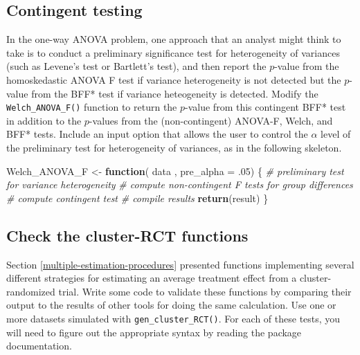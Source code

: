 \documentclass[
]{book}
\newenvironment{Shaded}{\begin{snugshade}}{\end{snugshade}}
\newcommand{\AttributeTok}[1]{\textcolor[rgb]{0.13,0.29,0.53}{#1}}
\newcommand{\CommentTok}[1]{\textcolor[rgb]{0.56,0.35,0.01}{\textit{#1}}}
\newcommand{\ControlFlowTok}[1]{\textcolor[rgb]{0.13,0.29,0.53}{\textbf{#1}}}
\newcommand{\DecValTok}[1]{\textcolor[rgb]{0.00,0.00,0.81}{#1}}
\newcommand{\FunctionTok}[1]{\textcolor[rgb]{0.13,0.29,0.53}{\textbf{#1}}}
\newcommand{\NormalTok}[1]{#1}
\newcommand{\OtherTok}[1]{\textcolor[rgb]{0.56,0.35,0.01}{#1}}
\begin{document}
\subsection{Contingent testing}\label{contingent-testing}

In the one-way ANOVA problem, one approach that an analyst might think to take is to conduct a preliminary significance test for heterogeneity of variances (such as Levene's test or Bartlett's test), and then report the \(p\)-value from the homoskedastic ANOVA F test if variance heterogeneity is not detected but the \(p\)-value from the BFF* test if variance heteogeneity is detected.
Modify the \texttt{Welch\_ANOVA\_F()} function to return the \(p\)-value from this contingent BFF* test in addition to the \(p\)-values from the (non-contingent) ANOVA-F, Welch, and BFF* tests.
Include an input option that allows the user to control the \(\alpha\) level of the preliminary test for heterogeneity of variances, as in the following skeleton.

\begin{Shaded}
\begin{Highlighting}[]
\NormalTok{Welch\_ANOVA\_F }\OtherTok{\textless{}{-}} \ControlFlowTok{function}\NormalTok{( data , }\AttributeTok{pre\_alpha =}\NormalTok{ .}\DecValTok{05}\NormalTok{) \{}
  \CommentTok{\# preliminary test for variance heterogeneity}
  \CommentTok{\# compute non{-}contingent F tests for group differences}
  \CommentTok{\# compute contingent test}
  \CommentTok{\# compile results}
  \FunctionTok{return}\NormalTok{(result)}
\NormalTok{\}}
\end{Highlighting}
\end{Shaded}

\subsection{Check the cluster-RCT functions}\label{cross-check-CRT-estimators}

Section \ref{multiple-estimation-procedures} presented functions implementing several different strategies for estimating an average treatment effect from a cluster-randomized trial.
Write some code to validate these functions by comparing their output to the results of other tools for doing the same calculation.
Use one or more datasets simulated with \texttt{gen\_cluster\_RCT()}.
For each of these tests, you will need to figure out the appropriate syntax by reading the package documentation.
\end{document}
